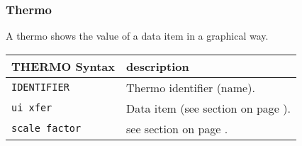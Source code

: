 \subsubsection{Thermo}
\label{sec:uithermo}
A thermo shows the value of a data item in a graphical way.



\begin{tabularx}{\textwidth}{l|X}
THERMO Syntax       & description \\
\hline
\verb+IDENTIFIER+   & Thermo identifier (name). \\
\verb+ui xfer+      & Data item (see section \nameref{dia:uixfer} on page \pageref{dia:uixfer}). \\
\verb+scale factor+ & see section \nameref{sec:scale} on page \pageref{sec:scale}. \\
\end{tabularx}


\label{sec:uithermooption}


